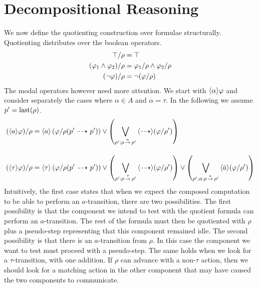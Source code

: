 \section{Decompositional Reasoning} %
\label{sec:decomp_hml}

We now define the quotienting construction over formulae structurally. 
Quotienting distributes over the boolean operators.
\begin{align*}
\top / \rho &= \top \\
(\varphi_1 \land \varphi_2)/\rho &= \varphi_1/\rho  \land \varphi_2 / \rho \\
(\neg\varphi)/\rho &= \neg(\varphi/\rho) \\
\end{align*}
The modal operators however need more attention. We start with $\mbox{\ensuremath{\langle \alpha \rangle}}\varphi$
and consider separately the cases where $\alpha\in A$ and $\alpha = \tau$. In
the following we assume $p' = \operatorname{last}(\rho)$.
\begin{align*}
    (\mbox{\ensuremath{\langle a \rangle}}\varphi) / \rho &= \mbox{\ensuremath{\langle a \rangle}} \left(\varphi / \rho(p'\ {\stackrel{_{}}{\dashrightarrow}}\  p')\right)
        \lor \left(\bigvee_{\rho' : \rho\,{\stackrel{{a}}{\rightarrow}}\,\rho'} \mbox{\ensuremath{\langle\stackrel{_{}}{\dashrightarrow}\rangle}} (\varphi/\rho') \right)
    \\[1em]
    (\mbox{\ensuremath{\langle \tau \rangle}}\varphi) / \rho &= \mbox{\ensuremath{\langle \tau \rangle}} \left(\varphi / \rho(p'\ {\stackrel{_{}}{\dashrightarrow}}\  p')\right)
        \lor \left(\bigvee_{\rho' : \rho\,{\stackrel{{\tau}}{\rightarrow}}\,\rho'} \mbox{\ensuremath{\langle\stackrel{_{}}{\dashrightarrow}\rangle}} (\varphi/\rho') \right)
        \lor \left( \bigvee_{\rho',a : \rho \,{\stackrel{{a}}{\rightarrow}}\, \rho'} \mbox{\ensuremath{\langle \bar{a} \rangle}} (\varphi/\rho')  \right)
\end{align*}
Intuitively, the first case states that when we expect the composed computation to be
able to perform an $a$-transition, there are two possibilities. The first possibility
is that the component
we intend to test with the quotient formula can perform an $a$-transition. The rest of the
formula must then be quotiented with $\rho$ plus a pseudo-step representing that this
component remained idle.
The second possibility is that there is an $a$-transition from $\rho$. In this case
the component we want to test must proceed with a pseudo-step.
The same holds when we look
for a $\tau$-transition, with one addition.  If $\rho$ can advance with a non-$\tau$
action, then we should look for a matching action in the other component that may
have caused the two components to communicate.

